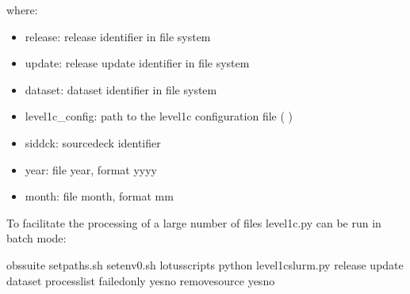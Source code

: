 \documentclass[letterpaper,10pt,english]{sphinxmanual}
\begin{document}
where:
\begin{itemize}
\item {}
release: release identifier in file system

\item {}
update: release update identifier in file system

\item {}
dataset: dataset identifier in file system

\item {}
level1c\_config: path to the level1c configuration file ( {\hyperref[\detokenize{index:level1c-config-file}]{}})

\item {}
sid\sphinxhyphen{}dck: source\sphinxhyphen{}deck identifier

\item {}
year: file year, format yyyy

\item {}
month: file month, format mm

\end{itemize}

To facilitate the processing of a large number of files level1c.py can be run
in batch mode:

\begin{sphinxVerbatim}[commandchars=\\\{\}]
 obs\PYGZhy{}suite
 setpaths.sh
 setenv0.sh
 lotus\PYGZus{}scripts
python level1c\PYGZus{}slurm.py release update dataset  process\PYGZus{}list \PYGZhy{}\PYGZhy{}failed\PYGZus{}only yesno \PYGZhy{}\PYGZhy{}remove\PYGZus{}source yesno
\end{sphinxVerbatim}
\end{document}
